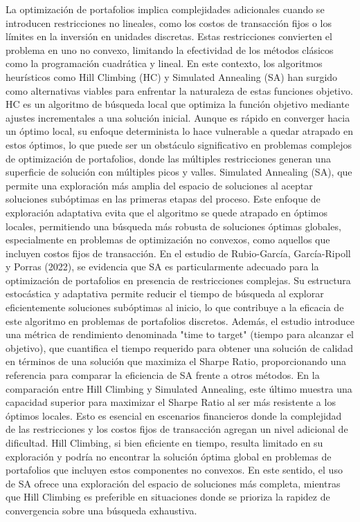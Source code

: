 \documentclass[9pt,a4paper,twoside]{rho-class/rho}
\begin{document}
        La optimización de portafolios implica complejidades adicionales cuando se introducen restricciones no lineales, como los costos de transacción fijos o los límites en la inversión en unidades discretas. Estas restricciones convierten el problema en uno no convexo, limitando la efectividad de los métodos clásicos como la programación cuadrática y lineal. En este contexto, los algoritmos heurísticos como Hill Climbing (HC) y Simulated Annealing (SA) han surgido como alternativas viables para enfrentar la naturaleza de estas funciones objetivo. HC es un algoritmo de búsqueda local que optimiza la función objetivo mediante ajustes incrementales a una solución inicial. Aunque es rápido en converger hacia un óptimo local, su enfoque determinista lo hace vulnerable a quedar atrapado en estos óptimos, lo que puede ser un obstáculo significativo en problemas complejos de optimización de portafolios, donde las múltiples restricciones generan una superficie de solución con múltiples picos y valles. Simulated Annealing (SA), que permite una exploración más amplia del espacio de soluciones al aceptar soluciones subóptimas en las primeras etapas del proceso. Este enfoque de exploración adaptativa evita que el algoritmo se quede atrapado en óptimos locales, permitiendo una búsqueda más robusta de soluciones óptimas globales, especialmente en problemas de optimización no convexos, como aquellos que incluyen costos fijos de transacción. En el estudio de Rubio-García, García-Ripoll y Porras (2022), se evidencia que SA es particularmente adecuado para la optimización de portafolios en presencia de restricciones complejas. Su estructura estocástica y adaptativa permite reducir el tiempo de búsqueda al explorar eficientemente soluciones subóptimas al inicio, lo que contribuye a la eficacia de este algoritmo en problemas de portafolios discretos. Además, el estudio introduce una métrica de rendimiento denominada "time to target" (tiempo para alcanzar el objetivo), que cuantifica el tiempo requerido para obtener una solución de calidad en términos de una solución que maximiza el Sharpe Ratio, proporcionando una referencia para comparar la eficiencia de SA frente a otros métodos.
        En la comparación entre Hill Climbing y Simulated Annealing, este último muestra una capacidad superior para maximizar el Sharpe Ratio al ser más resistente a los óptimos locales. Esto es esencial en escenarios financieros donde la complejidad de las restricciones y los costos fijos de transacción agregan un nivel adicional de dificultad. Hill Climbing, si bien eficiente en tiempo, resulta limitado en su exploración y podría no encontrar la solución óptima global en problemas de portafolios que incluyen estos componentes no convexos. En este sentido, el uso de SA ofrece una exploración del espacio de soluciones más completa, mientras que Hill Climbing es preferible en situaciones donde se prioriza la rapidez de convergencia sobre una búsqueda exhaustiva.
\end{document}

